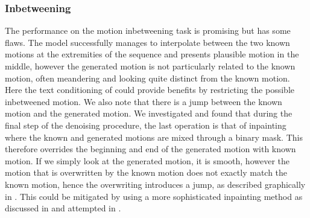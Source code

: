 \subsubsection{Inbetweening}
\label{sec:diffusion_baseline_inbetweening}

The performance on the motion inbetweening task is promising but has some flaws. The model successfully manages to interpolate between the two known motions at the extremities of the sequence and presents plausible motion in the middle, however the generated motion is not particularly related to the known motion, often meandering and looking quite distinct from the known motion. Here the text conditioning of \cite{MDM} could provide benefits by restricting the possible inbetweened motion. We also note that there is a jump between the known motion and the generated motion. We investigated and found that during the final step of the denoising procedure, the last operation is that of inpainting where the known and generated motions are mixed through a binary mask. This therefore overrides the beginning and end of the generated motion with known motion. If we simply look at the generated motion, it is smooth, however the motion that is overwritten by the known motion does not exactly match the known motion, hence the overwriting introduces a jump, as described graphically in . This could be mitigated by using a more sophisticated inpainting method as discussed in  and attempted in .

